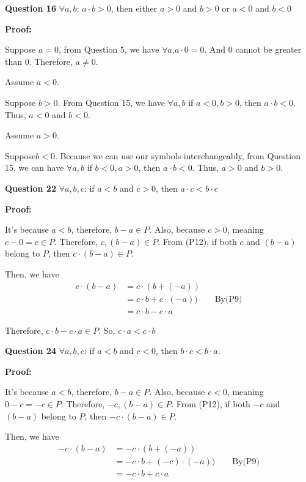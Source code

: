 \documentclass[a4paper,12pt]{report}
\begin{document}
\noindent
\textbf{Question 16} $\forall a,b$: $a\cdot{b}>0$, then either $a>0$ and $b>0$ or $a<0$ and $b<0$

\noindent
\textbf{Proof:}

\noindent
Suppose $a=0$, from Question 5, we have $\forall a$,$a\cdot{0}=0$. And 0 cannot be greater than 0. Therefore, $a\neq 0$.

\noindent
Assume $a < 0$.

\noindent
Suppose $b>0$. From Question 15, we have $\forall a,b$ if $a<0, b>0$, then $ a\cdot{b}<0$. Thus, $a<0$ and $b<0$.

\noindent
Assume $a>0$. 

\noindent
Suppose$b<0$. Because we can use our symbols interchangeably, from Question 15, we can have $\forall a,b$ if $b<0, a>0$, then $ a\cdot{b}<0$. Thus, $a>0$ and $b>0$.


\noindent
\textbf{Question 22} $\forall a,b,c$: if $a<b$ and $c>0$, then $a\cdot{c}<b\cdot{c}$

\noindent
\textbf{Proof:}

\noindent
It's because $a<b$, therefore, $b-a\in P$. Also, because $c>0$, meaning $c-0 = c\in P$. Therefore, $c,(b-a)\in P$. From (P12), if both $c$ and $(b-a)$ belong to $P$, then $c\cdot{(b-a)}\in P$.

\noindent
Then, we have  
\begin{align*}
 c\cdot{(b-a)} & = c\cdot{(b+(-a))}\\
 & = c\cdot{b}+c\cdot{(-a))}\qquad \text{By(P9)}\\
 & = c\cdot{b} - c\cdot{a}
\end{align*}

\noindent
Therefore, $c\cdot{b}-c\cdot{a}\in P$. So, $c\cdot{a}<c\cdot{b}$

\noindent
\textbf{Question 24} $\forall a,b,c$: if $a<b$ and $c<0$, then $b\cdot{c}<b\cdot{a}$.

\noindent
\textbf{Proof:}

\noindent
It's because $a<b$, therefore, $b-a\in P$. Also, because $c<0$, meaning $0-c=-c\in P$.  Therefore, $-c,(b-a)\in P$. From (P12), if both $-c$ and $(b-a)$ belong to $P$, then $-c\cdot{(b-a)}\in P$.

\noindent
Then, we have  
\begin{align*}
 -c\cdot{(b-a)} & = -c\cdot{(b+(-a))}\\
 & = -c\cdot{b}+(-c)\cdot{(-a))}\qquad \text{By(P9)}\\
 & = -c\cdot{b} + c\cdot{a}
\end{align*}
\end{document}
